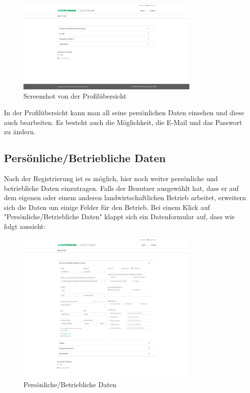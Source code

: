 \begin{figure}[H]
	\centerline{
		\includegraphics[width=0.8\textwidth]{./grafiken/erm_profil.png}
	}
	\vskip0pt
	\caption{Screenshot von der Profilübersicht} \label{fig:profil}
\end{figure}

In der Profilübersicht kann man all seine persönlichen Daten einsehen und diese auch bearbeiten. Es besteht auch die Möglichkeit, die E-Mail und das Passwort zu ändern.

\subsection{Persönliche/Betriebliche Daten}

Nach der Registrierung ist es möglich, hier noch weiter persönliche und betriebliche Daten einzutragen. Falls der Benutzer ausgewählt hat, dass er auf dem eigenen oder einem anderen landwirtschaftlichen Betrieb arbeitet, erweitern sich die Daten um einige Felder für den Betrieb. Bei einem Klick auf "Persönliche/Betriebliche Daten" klappt sich ein Datenformular auf, dass wie folgt aussieht:

\begin{figure}[H]
	\centerline{
		\includegraphics[width=0.8\textwidth]{./grafiken/erm_profil_daten.png}
	}
	\vskip0pt
	\caption{Persönliche/Betriebliche Daten} \label{fig:profilData}
\end{figure}

